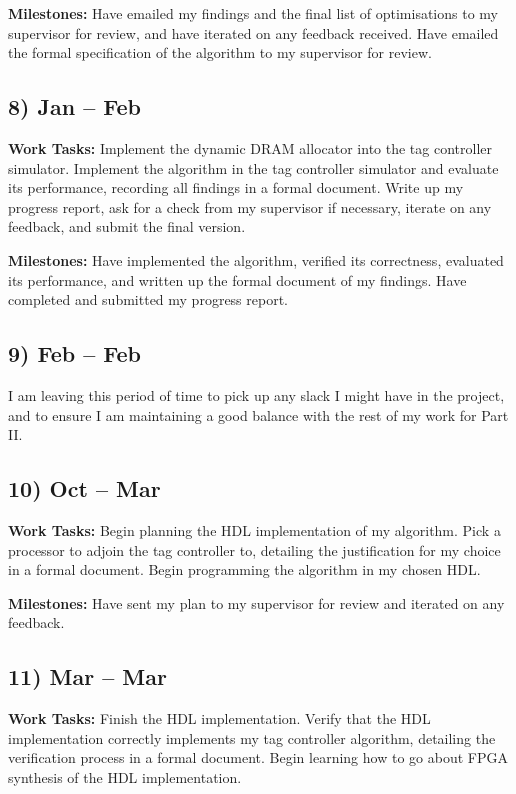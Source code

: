 \documentclass[10pt,a4paper]{article}
\begin{document}
\textbf{Milestones:} Have emailed my findings and the final list of optimisations to my supervisor for review, and have iterated on any feedback received. Have emailed the formal specification of the algorithm to my supervisor for review.

\subsection*{8)  Jan --  Feb}
\textbf{Work Tasks:} Implement the dynamic DRAM allocator into the tag controller simulator. Implement the algorithm in the tag controller simulator and evaluate its performance, recording all findings in a formal document. Write up my progress report, ask for a check from my supervisor if necessary, iterate on any feedback, and submit the final version.

\textbf{Milestones:} Have implemented the algorithm, verified its correctness, evaluated its performance, and written up the formal document of my findings. Have completed and submitted my progress report.

\subsection*{9)  Feb --  Feb}
I am leaving this period of time to pick up any slack I might have in the project, and to ensure I am maintaining a good balance with the rest of my work for Part II.

\subsection*{10)  Oct --  Mar}
\textbf{Work Tasks:} Begin planning the HDL implementation of my algorithm. Pick a processor to adjoin the tag controller to, detailing the justification for my choice in a formal document. Begin programming the algorithm in my chosen HDL.

\textbf{Milestones:} Have sent my plan to my supervisor for review and iterated on any feedback.

\subsection*{11)  Mar --  Mar}
\textbf{Work Tasks:} Finish the HDL implementation. Verify that the HDL implementation correctly implements my tag controller algorithm, detailing the verification process in a formal document. Begin learning how to go about FPGA synthesis of the HDL implementation.
\end{document}

